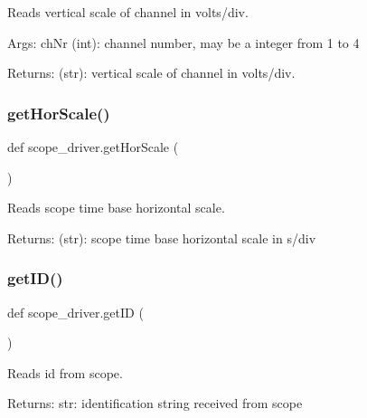 \begin{DoxyVerb}Reads vertical scale of channel in volts/div.

Args:
    chNr (int): channel number, may be a integer from 1 to 4
    
Returns:
    (str): vertical scale of channel in volts/div.
\end{DoxyVerb}
 \mbox{\label{namespacescope__driver_aca0699f139892ac173d2ce51bdacfaae}} 
\subsubsection{\texorpdfstring{get\+Hor\+Scale()}{getHorScale()}}
{\footnotesize\ttfamily def scope\+\_\+driver.\+get\+Hor\+Scale (\begin{DoxyParamCaption}{ }\end{DoxyParamCaption})}

\begin{DoxyVerb}Reads scope time base horizontal scale.

Returns:
    (str): scope time base horizontal scale in s/div
\end{DoxyVerb}
 \mbox{\label{namespacescope__driver_a89ba1842eabba389121069eefc856271}} 
\subsubsection{\texorpdfstring{get\+I\+D()}{getID()}}
{\footnotesize\ttfamily def scope\+\_\+driver.\+get\+ID (\begin{DoxyParamCaption}{ }\end{DoxyParamCaption})}

\begin{DoxyVerb}Reads id from scope.

Returns:
    str: identification string received from scope\end{DoxyVerb}
 \mbox{\label{namespacescope__driver_a3e836e0e5650976223df934af2662899}} 
